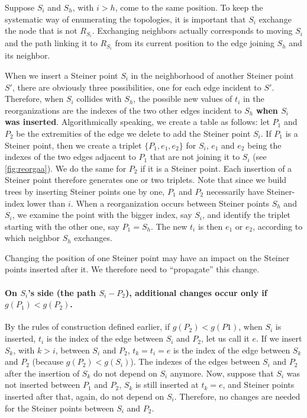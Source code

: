\documentclass{article}
\theoremstyle{plain}
\begin{document}
Suppose $S_i$ and $S_h$, with $i>h$, come to the same position. 
To keep the systematic way of enumerating the topologies, it is important that $S_i$ exchange the node that is not $R_{S_i}$. 
Exchanging neighbors actually corresponds to moving $S_i$ and the path linking it to $R_{S_i}$ from its current position to the edge joining $S_h$ and its neighbor. 



When we insert a Steiner point $S_i$ in the neighborhood of another Steiner point $S'$, there are obviously three possibilities, one for each edge incident to $S'$. 
Therefore, when $S_i$ collides with $S_h$, the possible new values of $t_i$ in the reorganizations are the indexes of the two other edges incident to $S_h$ \textbf{when $S_i$ was inserted}.  
Algorithmically speaking, we create a table as follows: let $P_1$ and $P_2$ be the extremities of the edge we delete to add the Steiner point $S_i$. 
If $P_1$ is a Steiner point, then we create a triplet $\{P_1,e_1,e_2\}$ for $S_i$, $e_1$ and $e_2$ being the indexes of the two edges adjacent to $P_1$ that are not joining it to $S_i$ (see \cref{fig:reorgaa}). 
We do the same for $P_2$ if it is a Steiner point. 
Each insertion of a Steiner point therefore generates one or two triplets. 
Note that since we build trees by inserting Steiner points one by one, $P_1$ and $P_2$ necessarily have Steiner-index lower than $i$. 
When a reorganization occurs between Steiner points $S_h$ and $S_i$, we examine the point with the bigger index, say $S_i$, and identify the triplet starting with the other one, say $P_1 = S_h$. The new $t_i$ is then $e_1$ or $e_2$, according to which neighbor $S_h$ exchanges. 


Changing the position of one Steiner point may have an impact on the Steiner points inserted after it.
We therefore need to ``propagate'' this change. 
\paragraph{On $S_i$'s side (the path $S_i - P_2$), additional changes occur only if $g(P_1) < g(P_2)$.}  
By the rules of construction defined earlier, if $g(P_2) < g(P1)$, when $S_i$ is inserted, $t_i$ is the index of the edge between $S_i$ and $P_2$, let us call it $e$. 
If we insert $S_k$, with $k>i$, between $S_i$ and $P_2$, $t_k = t_i = e$ is the index of the edge between $S_k$ and $P_2$ (because $g(P_2) < g(S_i)$). 
The indexes of the edges between $S_i$ and $P_2$ after the insertion of $S_k$ do not depend on $S_i$ anymore. 
Now, suppose that $S_i$ was not inserted between $P_1$ and $P_2$, $S_k$ is still inserted at $t_k = e$, and Steiner points inserted after that, again, do not depend on $S_i$. 
Therefore, no changes are needed for the Steiner points between $S_i$ and $P_2$.
\end{document}
